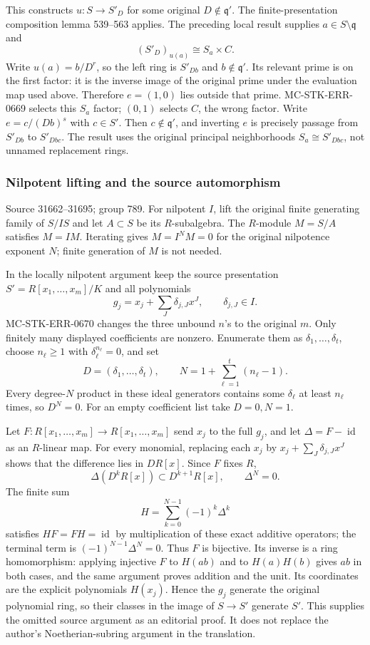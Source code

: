 This constructs \(u:S\to S'_D\) for some original \(D\notin\mathfrak q'\). The finite-presentation composition lemma 539--563 applies. The preceding local result supplies \(a\in S\setminus\mathfrak q\) and \[
(S'_D)_{u(a)}\cong S_a\times C.
\] Write \(u(a)=b/D^r\), so the left ring is \(S'_{Db}\) and \(b\notin\mathfrak q'\). Its relevant prime is on the first factor: it is the inverse image of the original prime under the evaluation map used above. Therefore \(e=(1,0)\) lies outside that prime. MC-STK-ERR-0669 selects this \(S_a\) factor; \((0,1)\) selects \(C\), the wrong factor. Write \(e=c/(Db)^s\) with \(c\in S'\). Then \(c\notin\mathfrak q'\), and inverting \(e\) is precisely passage from \(S'_{Db}\) to \(S'_{Dbc}\). The result uses the original principal neighborhoods \(S_a\cong S'_{Dbc}\), not unnamed replacement rings.

\subsubsection{Nilpotent lifting and the source automorphism}\label{algebra-proof-035-nilpotent-lifting-and-the-source-automorphism}

Source 31662--31695; group 789. For nilpotent \(I\), lift the original finite generating family of \(S/IS\) and let \(A\subset S\) be its \(R\)-subalgebra. The \(R\)-module \(M=S/A\) satisfies \(M=IM\). Iterating gives \(M=I^NM=0\) for the original nilpotence exponent \(N\); finite generation of \(M\) is not needed.

In the locally nilpotent argument keep the source presentation \(S'=R[x_1,\ldots,x_m]/K\) and all polynomials \[
g_j=x_j+\sum_J\delta_{j,J}x^J,\qquad \delta_{j,J}\in I.
\] MC-STK-ERR-0670 changes the three unbound \(n\)'s to the original \(m\). Only finitely many displayed coefficients are nonzero. Enumerate them as \(\delta_1,\ldots,\delta_t\), choose \(n_\ell\ge1\) with \(\delta_\ell^{n_\ell}=0\), and set \[
D=(\delta_1,\ldots,\delta_t),\qquad N=1+\sum_{\ell=1}^t(n_\ell-1).
\] Every degree-\(N\) product in these ideal generators contains some \(\delta_\ell\) at least \(n_\ell\) times, so \(D^N=0\). For an empty coefficient list take \(D=0,N=1\).

Let \(F:R[x_1,\ldots,x_m]\to R[x_1,\ldots,x_m]\) send \(x_j\) to the full \(g_j\), and let \(\Delta=F-\operatorname{id}\) as an \(R\)-linear map. For every monomial, replacing each \(x_j\) by \(x_j+\sum_J\delta_{j,J}x^J\) shows that the difference lies in \(D R[x]\). Since \(F\) fixes \(R\), \[
\Delta(D^kR[x])\subset D^{k+1}R[x],\qquad \Delta^N=0.
\] The finite sum \[
H=\sum_{k=0}^{N-1}(-1)^k\Delta^k
\] satisfies \(HF=FH=\operatorname{id}\) by multiplication of these exact additive operators; the terminal term is \((-1)^{N-1}\Delta^N=0\). Thus \(F\) is bijective. Its inverse is a ring homomorphism: applying injective \(F\) to \(H(ab)\) and to \(H(a)H(b)\) gives \(ab\) in both cases, and the same argument proves addition and the unit. Its coordinates are the explicit polynomials \(H(x_j)\). Hence the \(g_j\) generate the original polynomial ring, so their classes in the image of \(S\to S'\) generate \(S'\). This supplies the omitted source argument as an editorial proof. It does not replace the author's Noetherian-subring argument in the translation.

